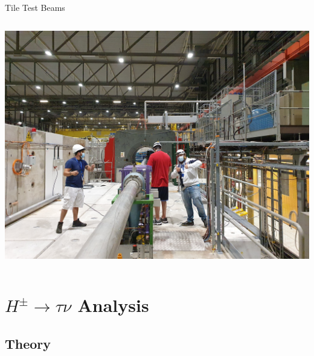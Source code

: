 \documentclass[aspectratio=169,xcolor=table]{beamer}
\newcommand{\Hp}{\ensuremath{H^{\pm}}\xspace}
\newcommand{\HpLong}{\ensuremath{\Hp \rightarrow \tau \nu}\xspace}
\begin{document}
\begin{frame}[t]{Tile Test Beams}
\begin{columns}
        \includegraphics[width=.9\textwidth,keepaspectratio=true]{CherenkovDetector_Andrew_Will_Me.jpg}
      \end{columns}
    \end{frame}

\section{\HpLong Analysis }

  \subsection{Theory}
\end{document}
